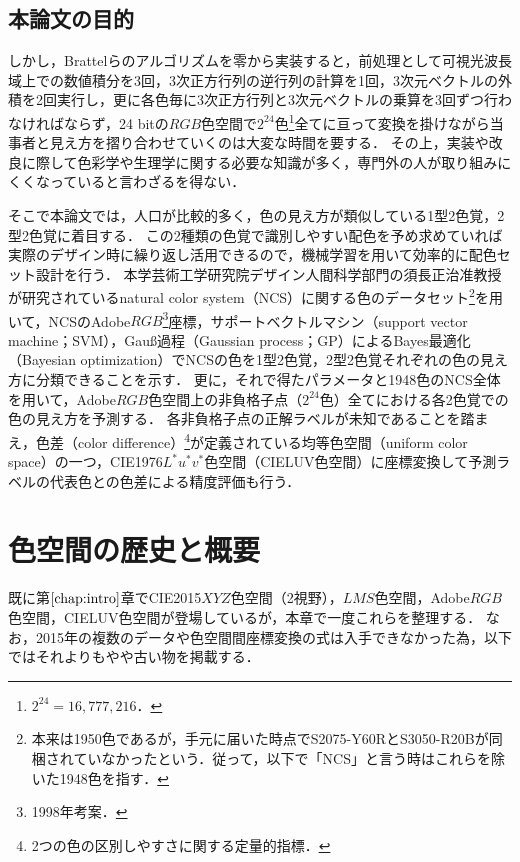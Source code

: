 \documentclass[uplatex,paper=a4,fontsize=4.0truemm,jafontsize=4.0truemm,head_space=30.0truemm,foot_space=30.0truemm,baselineskip=8.0truemm,line_length=40zw,gutter=25.0truemm,oneside,openany,fleqn,hanging_panctuation,open_bracket_pos=nibu_tentsuki,dvipdfmx,jis2004,book,titlepage]{jlreq}
\theoremstyle{mystyle}
\newcommand{\mathdisplaystyle}[1]{\(\displaystyle{#1}\)}
\newcommand{\Reference}[1]{\mathdisplaystyle{\ref{#1}}}
\begin{document}
		\section{本論文の目的}
			しかし，Brattelらのアルゴリズムを零から実装すると，前処理として可視光波長域上での数値積分を3回，3次正方行列の逆行列の計算を1回，3次元ベクトルの外積を2回実行し，更に各色毎に3次正方行列と3次元ベクトルの乗算を3回ずつ行わなければならず，24 bitの\mathdisplaystyle{RGB}色空間で\mathdisplaystyle{2^{24}}色\footnote{\mathdisplaystyle{2^{24}=16{,}777{,}216}．}全てに亘って変換を掛けながら当事者と見え方を摺り合わせていくのは大変な時間を要する．
			その上，実装や改良に際して色彩学や生理学に関する必要な知識が多く，専門外の人が取り組みにくくなっていると言わざるを得ない．

			そこで本論文では，人口が比較的多く，色の見え方が類似している1型2色覚，2型2色覚に着目する．
			この2種類の色覚で識別しやすい配色を予め求めていれば実際のデザイン時に繰り返し活用できるので，機械学習を用いて効率的に配色セット設計を行う．
			本学芸術工学研究院デザイン人間科学部門の須長正治准教授が研究されているnatural color system（NCS）に関する色のデータセット\footnote{本来は1950色であるが，手元に届いた時点でS2075-Y60RとS3050-R20Bが同梱されていなかったという．従って，以下で「NCS」と言う時はこれらを除いた1948色を指す．}を用いて，NCSのAdobe\mathdisplaystyle{RGB}\footnote{1998年考案．}座標，サポートベクトルマシン（support vector machine；SVM），Gauß過程（Gaussian process；GP）によるBayes最適化（Bayesian optimization）でNCSの色を1型2色覚，2型2色覚それぞれの色の見え方に分類できることを示す．
			更に，それで得たパラメータと1948色のNCS全体を用いて，Adobe\mathdisplaystyle{RGB}色空間上の非負格子点（\mathdisplaystyle{2^{24}}色）全てにおける各2色覚での色の見え方を予測する．
			各非負格子点の正解ラベルが未知であることを踏まえ，色差（color difference）\footnote{2つの色の区別しやすさに関する定量的指標．}が定義されている均等色空間（uniform color space）の一つ，CIE1976\mathdisplaystyle{L^\ast u^\ast v^\ast}色空間（CIELUV色空間）\cite[p.~64]{Yaguchi2017b}に座標変換して予測ラベルの代表色との色差による精度評価も行う．
	\chapter{色空間の歴史と概要}
		既に第\Reference{chap:intro}章でCIE2015\mathdisplaystyle{XYZ}色空間（2\textdegree 視野），\mathdisplaystyle{LMS}色空間，Adobe\mathdisplaystyle{RGB}色空間，CIELUV色空間が登場しているが，本章で一度これらを整理する．
		なお，2015年の複数のデータや色空間間座標変換の式は入手できなかった為，以下ではそれよりもやや古い物を掲載する．
\end{document}
